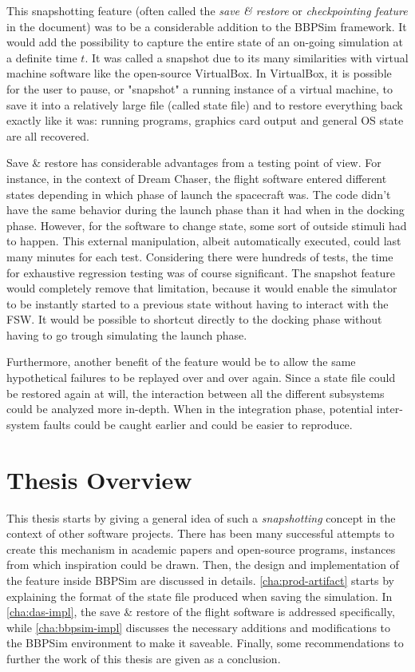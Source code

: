 This snapshotting feature (often called the \textit{save \& restore} or \textit{checkpointing feature} in the document) was to be a considerable addition to the \gls{BBPSim} framework. It would add the possibility to capture the entire state of an on-going simulation at a definite time $t$. It was called a snapshot due to its many similarities with virtual machine software like the open-source VirtualBox. In VirtualBox, it is possible for the user to pause, or "snapshot" a running instance of a virtual machine, to save it into a relatively large file (called state file) and to restore everything back exactly like it was: running programs, graphics card output and general OS state are all recovered.  

Save \& restore has considerable advantages from a testing point of view. For instance, in the context of Dream Chaser, the flight software entered different states depending in which phase of launch the spacecraft was. The code didn't have the same behavior during the launch phase than it had when in the docking phase. However, for the software to change state, some sort of outside stimuli had to happen. This external manipulation, albeit automatically executed, could last many minutes for each test. Considering there were hundreds of tests, the time for exhaustive regression testing was of course significant. The snapshot feature would completely remove that limitation, because it would enable the simulator to be instantly started to a previous state without having to interact with the \gls{FSW}. It would be possible to shortcut directly to the docking phase without having to go trough simulating the launch phase. 

Furthermore, another benefit of the feature would be to allow the same hypothetical failures to be replayed over and over again. Since a state file could be restored again at will, the interaction between all the different subsystems could be analyzed more in-depth. When in the integration phase, potential inter-system faults could be caught earlier and could be easier to reproduce.  

\section{Thesis Overview}
This thesis starts by giving a general idea of such a \textit{snapshotting} concept in the context of other software projects. There has been many successful attempts to create this mechanism in academic papers and open-source programs, instances from which inspiration could be drawn. Then, the design and implementation of the feature inside \gls{BBPSim} are discussed in details. \autoref{cha:prod-artifact} starts by explaining the format of the state file produced when saving the simulation. In \autoref{cha:das-impl}, the save \& restore of the flight software is addressed specifically, while \autoref{cha:bbpsim-impl} discusses the necessary additions and modifications to the BBPSim environment to make it saveable. Finally, some recommendations to further the work of this thesis are given as a conclusion.
